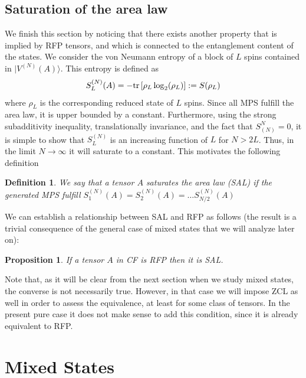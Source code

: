 \documentclass{elsarticle}
\newcommand{\be}{\begin{equation}}
\newcommand{\ee}{\end{equation}}
\newtheorem{prop}[thm]{Proposition}
\newtheorem{defn}[thm]{Definition}
\begin{document}
\subsection{Saturation of the area law}

We finish this section by noticing that there exists another property that is implied by RFP tensors, and which is connected to the entanglement content of the states. We consider the von Neumann entropy of a block of $L$ spins contained in $|V^{(N)}(A)\rangle$. This entropy is defined as
 \be
 S_L^{(N)}(A) = - {\rm tr}\left[\rho_L \log_2(\rho_L)\right]:= S(\rho_L)
 \ee
where $\rho_L$ is the corresponding reduced state of $L$ spins. Since all MPS fulfill the area law, it is upper bounded by a constant. Furthermore, using the strong subadditivity inequality, translationally invariance, and the fact that $S_{(N)}^N=0$, it is simple to show that $S_L^{(N)}$ is an increasing function of $L$ for $N>2L$. Thus, in the limit $N\to \infty$ it will saturate to a constant. This motivates the following definition
 \begin{defn}
 We say that a tensor $A$ {\em saturates the area law} (SAL) if the generated MPS fulfill $S_1^{(N)}(A)=S_2^{(N)}(A)=\ldots S_{N/2}^{(N)}(A)$
 \end{defn}

We can establish a relationship between SAL and RFP as follows (the result is a trivial consequence of the general case of mixed states that we will analyze later on):

\begin{prop}
\label{ZCLandSALpure}
If a tensor $A$ in CF is RFP then it is SAL.
\end{prop}

Note that, as it will be clear from the next section when we study mixed states, the converse is not necessarily true. However, in that case we will impose ZCL as well in order to assess the equivalence, at least for some class of tensors. In the present pure case it does not make sense to add this condition, since it is already equivalent to RFP.


\section{Mixed States}\label{Sec:mixed-states}
\end{document}
